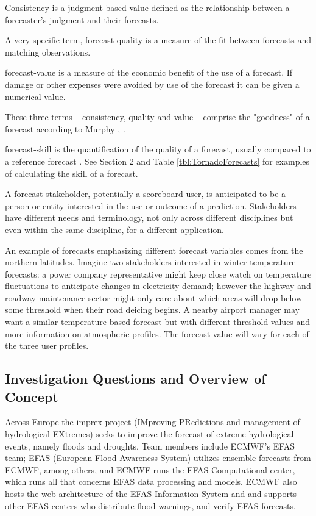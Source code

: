 \documentclass[logos,parttoc,morelanguage=french,morelanguage=german]{orsay-memoire}
\begin{document}
Consistency is a judgment-based value defined as the relationship between a forecaster's judgment and their forecasts.

A very specific term, \gls{forecast-quality} is a measure of the fit between forecasts and matching observations. 

\gls{forecast-value} is a measure of the economic benefit of the use of a forecast. If damage or other expenses were avoided by use of the forecast it can be given a numerical value.

These three terms -- consistency, quality and value -- comprise the "goodness" of a forecast according to Murphy  \autocite{JolliffeIanT.andStephenson2012ForecastVerification}, \autocite{murphy1993good}.

\gls{forecast-skill} is the quantification of the quality of a forecast, usually compared to a reference forecast \autocite{JolliffeIanT.andStephenson2012ForecastVerification}. See Section 2 and Table \ref{tbl:TornadoForecasts} for examples of calculating the skill of a forecast.

A forecast stakeholder, potentially a \gls{scoreboard-user}, is anticipated to be a person or entity interested in the use or outcome of a prediction. Stakeholders have different needs and terminology, not only across different disciplines but even within the same discipline, for a different application.

An example of forecasts emphasizing different forecast variables comes from the northern latitudes. Imagine two stakeholders interested in winter temperature forecasts: a power company representative might keep close watch on temperature fluctuations to anticipate changes in electricity demand; however the highway and roadway maintenance sector might only care about which areas will drop below some threshold when their road deicing begins. A nearby airport manager may want a similar temperature-based forecast but with different threshold values and more information on atmospheric profiles. The \gls{forecast-value} will vary for each of the three user profiles.
 
\subsection{Investigation Questions and Overview of Concept}

Across Europe the \gls{imprex} project ({IM}proving {PR}edictions and management of hydrological {EX}tremes) seeks to improve the forecast of extreme hydrological events, namely floods and droughts. Team members include ECMWF's \gls{EFAS} team; EFAS (European Flood Awareness System) utilizes ensemble forecasts from ECMWF, among others, and ECMWF runs the EFAS Computational center, which runs all that concerns EFAS data processing and models. ECMWF also hosts the web architecture of the EFAS Information System and and supports other EFAS centers who distribute flood warnings, and verify EFAS forecasts.
\end{document}
